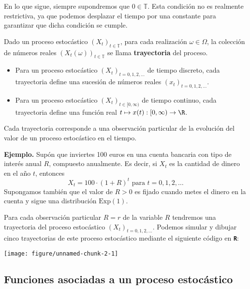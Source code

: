 En lo que sigue, siempre supondremos que $0\in \mathbb{T}$. Esta condición no es realmente restrictiva, ya que podemos desplazar el tiempo por una constante para garantizar que dicha condición se cumple.

\begin{definition}
    Dado un proceso estocástico $(X_t)_{t\in \mathbb{T}}$, para cada realización $\omega\in \Omega$, la colección de números reales $(X_t(\omega))_{t\in \mathbb{T}}$ se llama \textbf{trayectoria} del proceso. 
\end{definition}
\begin{itemize}[label=\textbullet]
    \item Para un proceso estocástico $(X_t)_{t=0,1,2,\dots}$ de tiempo discreto, cada trayectoria define una sucesión de números reales $(x_t)_{t=0,1,2,\dots}$.
    \item Para un proceso estocástico $(X_t)_{t\in [0,\infty)}$ de tiempo continuo, cada trayectoria define una función real $t\mapsto x(t):[0,\infty)\to \R$.
\end{itemize}
Cada trayectoria corresponde a una observación particular de la evolución del valor de un proceso estocástico en el tiempo.

\textbf{Ejemplo.} Supón que inviertes 100 euros en una cuenta bancaria con tipo de interés anual $R$, compuesto anualmente. Es decir, si  $X_t$ es la cantidad de dinero en el año  $t$, entonces  \[
X_t=100\cdot (1+R)^t \text{ para }t=0,1,2,\dots
\]  
Supongamos también que el valor de $R>0$ es fijado cuando metes el dinero en la cuenta y sigue una distribución  $\mathrm{Exp(1)}$.

Para cada observación particular $R=r$ de la variable  $R$ tendremos una trayectoria del proceso estocástico  $(X_t)_{t=0,1,2,\dots}$. Podemos simular y dibujar cinco trayectorias de este proceso estocástico mediante el siguiente código en \textbf{\texttt{R}}: 

\begin{knitrout}
\color{fgcolor}

{\centering \texttt{[image: figure/unnamed-chunk-2-1]} 

}


\end{knitrout}

\subsection{Funciones asociadas a un proceso estocástico}

